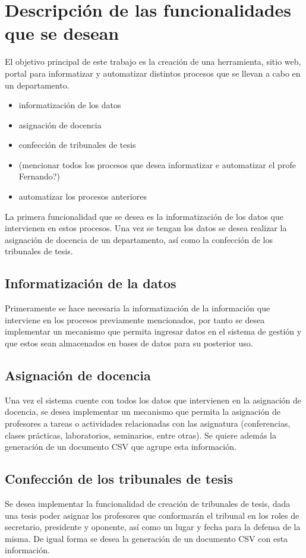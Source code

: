 \chapter{Descripción de las funcionalidades que se desean}\label{chapter:features}
El objetivo principal de este trabajo es la creación de
una herramienta, sitio web, portal para informatizar
y automatizar distintos procesos que se llevan a cabo 
en un departamento.

\begin{itemize}
    \item informatización de los datos
    \item asignación de docencia
    \item confección de tribunales de tesis
    \item (mencionar todos los procesos que desea informatizar e automatizar el profe Fernando?)
    \item automatizar los procesos anteriores
\end{itemize}


La primera funcionalidad que se desea es la informatización
de los datos que intervienen en estos procesos.
Una vez se tengan los datos se desea realizar la 
asignación de docencia de un departamento, así como la
confección de los tribunales de tesis.

\section{Informatización de la datos}
Primeramente se hace necesaria la informatización 
de la información que interviene en los procesos 
previamente mencionados, por tanto se desea implementar
un mecanismo que permita ingresar datos en el sistema
de gestión y que estos sean almacenados en bases de
datos para su posterior uso.

\section{Asignación de docencia}
Una vez el sistema cuente con todos los datos que 
intervienen en la asignación de docencia, se desea 
implementar un mecanismo que permita la asignación
de profesores a tareas o actividades relacionadas
con las asignatura (conferencias, clases prácticas,
laboratorios, seminarios, entre otras).
Se quiere además la generación de un documento
CSV que agrupe esta información.


\section{Confección de los tribunales de tesis}
Se desea implementar la funcionalidad de creación
de tribunales de tesis, dada una tesis poder asignar
los profesores que conformarán el tribunal en los
roles de secretario, presidente y oponente, así como
un lugar y fecha para la defensa de la misma. De igual
forma se desea la generación de un documento CSV con
esta información.
